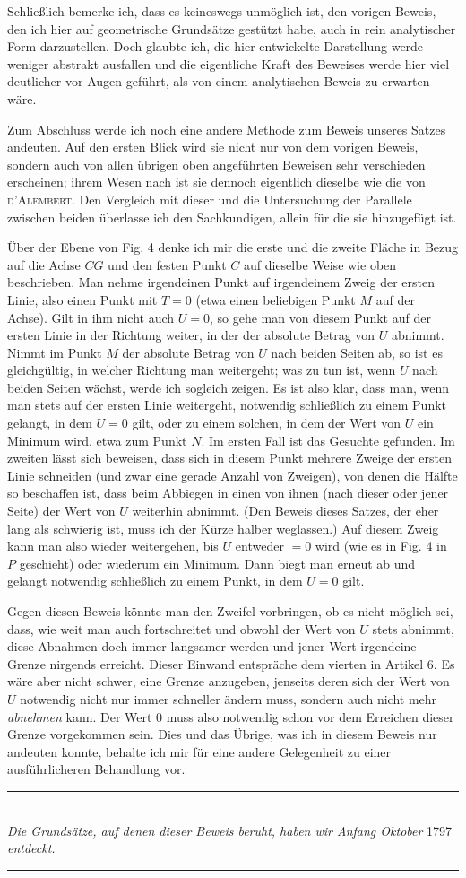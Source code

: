Schließlich bemerke ich, dass es keineswegs unmöglich ist, den vorigen Beweis, den ich hier auf geometrische Grundsätze gestützt habe, auch in rein analytischer Form darzustellen. Doch glaubte ich, die hier entwickelte Darstellung werde weniger abstrakt ausfallen und die eigentliche Kraft des Beweises werde hier viel deutlicher vor Augen geführt, als von einem analytischen Beweis zu erwarten wäre.

Zum Abschluss werde ich noch eine andere Methode zum Beweis unseres Satzes andeuten. Auf den ersten Blick wird sie nicht nur von dem vorigen Beweis, sondern auch von allen übrigen oben angeführten Beweisen sehr verschieden erscheinen; ihrem Wesen nach ist sie dennoch eigentlich dieselbe wie die von \textsc{d'Alembert}. Den Vergleich mit dieser und die Untersuchung der Parallele zwischen beiden überlasse ich den Sachkundigen, allein für die sie hinzugefügt ist.

 Über der Ebene von Fig. 4 denke ich mir die erste und die zweite Fläche in Bezug auf die Achse $CG$ und den festen Punkt $C$ auf dieselbe Weise wie oben beschrieben. Man nehme irgendeinen Punkt auf irgendeinem Zweig der ersten Linie, also einen Punkt mit $T=0$ (etwa einen beliebigen Punkt $M$ auf der Achse). Gilt in ihm nicht auch $U=0$, so gehe man von diesem Punkt auf der ersten Linie in der Richtung weiter, in der der absolute
 Betrag von $U$ abnimmt. Nimmt im Punkt $M$ der absolute Betrag von $U$ nach beiden Seiten ab, so ist es gleichgültig, in welcher Richtung man weitergeht; was zu tun ist, wenn $U$ nach beiden Seiten wächst, werde ich sogleich zeigen. Es ist also klar, dass man, wenn man stets auf der ersten Linie weitergeht, notwendig schließlich zu einem Punkt gelangt, in dem $U=0$ gilt, oder zu einem solchen, in dem der Wert von $U$ ein Minimum wird, etwa zum Punkt $N$. Im ersten Fall ist das Gesuchte gefunden. Im zweiten lässt sich beweisen, dass sich in diesem Punkt mehrere Zweige der ersten Linie schneiden (und zwar eine gerade Anzahl von Zweigen), von denen die Hälfte so beschaffen ist, dass beim Abbiegen in einen von ihnen (nach dieser oder jener Seite) der Wert von $U$ weiterhin abnimmt. (Den Beweis dieses Satzes, der eher lang als schwierig ist, muss ich der Kürze halber weglassen.) Auf diesem Zweig kann man also wieder weitergehen, bis $U$ entweder $=0$ wird (wie es in Fig. 4 in $P$ geschieht) oder wiederum ein Minimum. Dann biegt man erneut ab und gelangt notwendig schließlich zu einem Punkt, in dem $U=0$ gilt.

Gegen diesen Beweis könnte man den Zweifel vorbringen, ob es nicht möglich sei, dass, wie weit man auch fortschreitet und obwohl der Wert von $U$ stets abnimmt, diese Abnahmen doch immer langsamer werden und jener Wert irgendeine Grenze nirgends erreicht. Dieser Einwand entspräche dem vierten in Artikel 6. Es wäre aber nicht schwer, eine Grenze anzugeben, jenseits deren sich der Wert von $U$ notwendig nicht nur immer schneller ändern muss, sondern auch nicht mehr \textit{abnehmen} kann. Der Wert 0 muss also notwendig schon vor dem Erreichen dieser Grenze vorgekommen sein. Dies und das Übrige, was ich in diesem Beweis nur andeuten konnte, behalte ich mir für eine andere Gelegenheit zu einer ausführlicheren Behandlung vor.

\begin{center}
\rule{8cm}{0.3pt}\\[8pt]
\textit{Die Grundsätze, auf denen dieser Beweis beruht, haben wir Anfang Oktober} 1797 \textit{entdeckt.}\\[8pt]
\rule{5cm}{0.3pt}
\end{center}
